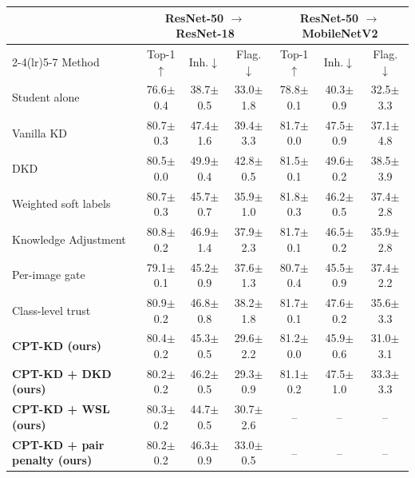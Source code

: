 \begin{tabular}{l ccc ccc}
\toprule
 & \multicolumn{3}{c}{ResNet-50 $\to$ ResNet-18} & \multicolumn{3}{c}{ResNet-50 $\to$ MobileNetV2} \\
\cmidrule(lr){2-4}\cmidrule(lr){5-7}
Method & Top-1$\uparrow$ & Inh.$\downarrow$ & Flag.$\downarrow$ & Top-1$\uparrow$ & Inh.$\downarrow$ & Flag.$\downarrow$ \\
\midrule
Student alone & 76.6{\scriptsize$\pm$0.4} & 38.7{\scriptsize$\pm$0.5} & 33.0{\scriptsize$\pm$1.8} & 78.8{\scriptsize$\pm$0.1} & 40.3{\scriptsize$\pm$0.9} & 32.5{\scriptsize$\pm$3.3} \\
Vanilla KD~\cite{hinton2015distilling} & 80.7{\scriptsize$\pm$0.3} & 47.4{\scriptsize$\pm$1.6} & 39.4{\scriptsize$\pm$3.3} & 81.7{\scriptsize$\pm$0.0} & 47.5{\scriptsize$\pm$0.9} & 37.1{\scriptsize$\pm$4.8} \\
DKD~\cite{zhao2022dkd} & 80.5{\scriptsize$\pm$0.0} & 49.9{\scriptsize$\pm$0.4} & 42.8{\scriptsize$\pm$0.5} & 81.5{\scriptsize$\pm$0.1} & 49.6{\scriptsize$\pm$0.2} & 38.5{\scriptsize$\pm$3.9} \\
Weighted soft labels~\cite{zhou2021wsl} & 80.7{\scriptsize$\pm$0.3} & 45.7{\scriptsize$\pm$0.7} & 35.9{\scriptsize$\pm$1.0} & 81.8{\scriptsize$\pm$0.3} & 46.2{\scriptsize$\pm$0.5} & 37.4{\scriptsize$\pm$2.8} \\
Knowledge Adjustment~\cite{wen2021preparing} & 80.8{\scriptsize$\pm$0.2} & 46.9{\scriptsize$\pm$1.4} & 37.9{\scriptsize$\pm$2.3} & 81.7{\scriptsize$\pm$0.1} & 46.5{\scriptsize$\pm$0.2} & 35.9{\scriptsize$\pm$2.8} \\
Per-image gate~\cite{mishra2026correctness} & 79.1{\scriptsize$\pm$0.1} & 45.2{\scriptsize$\pm$0.9} & 37.6{\scriptsize$\pm$1.3} & 80.7{\scriptsize$\pm$0.4} & 45.5{\scriptsize$\pm$0.9} & 37.4{\scriptsize$\pm$2.2} \\
Class-level trust~\cite{lukasik2022teacherspet} & 80.9{\scriptsize$\pm$0.2} & 46.8{\scriptsize$\pm$0.8} & 38.2{\scriptsize$\pm$1.8} & 81.7{\scriptsize$\pm$0.1} & 47.6{\scriptsize$\pm$0.2} & 35.6{\scriptsize$\pm$3.3} \\
\midrule
\textbf{CPT-KD (ours)} & 80.4{\scriptsize$\pm$0.2} & 45.3{\scriptsize$\pm$0.5} & 29.6{\scriptsize$\pm$2.2} & 81.2{\scriptsize$\pm$0.0} & 45.9{\scriptsize$\pm$0.6} & 31.0{\scriptsize$\pm$3.1} \\
\textbf{CPT-KD + DKD (ours)} & 80.2{\scriptsize$\pm$0.2} & 46.2{\scriptsize$\pm$0.5} & 29.3{\scriptsize$\pm$0.9} & 81.1{\scriptsize$\pm$0.2} & 47.5{\scriptsize$\pm$1.0} & 33.3{\scriptsize$\pm$3.3} \\
\textbf{CPT-KD + WSL (ours)} & 80.3{\scriptsize$\pm$0.2} & 44.7{\scriptsize$\pm$0.5} & 30.7{\scriptsize$\pm$2.6} & -- & -- & -- \\
\textbf{CPT-KD + pair penalty (ours)} & 80.2{\scriptsize$\pm$0.2} & 46.3{\scriptsize$\pm$0.9} & 33.0{\scriptsize$\pm$0.5} & -- & -- & -- \\
\bottomrule
\end{tabular}
